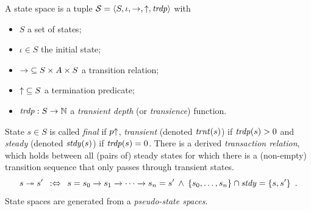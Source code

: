 \documentclass{article}
\begin{document}
\medskip\noindent 
A state space is a tuple $\mathcal{S}=\langle{S,\iota,{\rightarrow},{{\uparrow}},\ensuremath{\mathit{trdp}}}\rangle$ with
\begin{itemize}
\item $S$ a set of states;
\item $\iota\in S$ the initial state;
\item ${\rightarrow}\subseteq S\times A\times S$ a transition relation;
\item ${{\uparrow}}\subseteq S$ a termination predicate;
\item ${\mathit{trdp}}:S\to \mathbb{N}$ a \emph{transient depth} (or \emph{transience}) function.
\end{itemize}
%
State $s\in S$ is called \emph{final} if $p{\uparrow}$, \emph{transient} (denoted $\mathit{trnt}(s)$) if $\mathit{trdp}(s)>0$ and \emph{steady} (denoted $\mathit{stdy}(s)$) if $\mathit{trdp}(s)=0$. There is a derived \emph{transaction relation}, which holds between all (pairs of) steady states for which there is a (non-empty) transition sequence that only passes through transient states.
%
\[ s\ttrans s' \enspace\iffdef\enspace
   s=s_0\trans{} s_1\trans{} \cdots \trans{} s_n=s' \:\wedge\:
   \setof{s_0,\ldots,s_n} \cap \Steady=\setof{s,s'}  \enspace.
\]
%
State spaces are generated from a \emph{pseudo-state spaces}.
\end{document}
